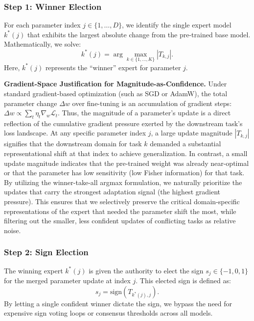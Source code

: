\subsubsection{Step 1: Winner Election}
For each parameter index $j \in \{1, \ldots, D\}$, we identify the single expert model $k^*(j)$ that exhibits the largest absolute change from the pre-trained base model.
Mathematically, we solve:
\begin{equation}
    k^*(j) = \arg\max_{k \in \{1, \dots, K\}} \left| T_{k, j} \right|.
\end{equation}
Here, $k^*(j)$ represents the ``winner'' expert for parameter $j$.

\textbf{Gradient-Space Justification for Magnitude-as-Confidence.}
Under standard gradient-based optimization (such as SGD or AdamW), the total parameter change $\Delta w$ over fine-tuning is an accumulation of gradient steps: $\Delta w \propto \sum_t \eta_t \nabla_{w} \mathcal{L}_t$.
Thus, the magnitude of a parameter's update is a direct reflection of the cumulative gradient pressure exerted by the downstream task's loss landscape.
At any specific parameter index $j$, a large update magnitude $|T_{k, j}|$ signifies that the downstream domain for task $k$ demanded a substantial representational shift at that index to achieve generalization.
In contrast, a small update magnitude indicates that the pre-trained weight was already near-optimal or that the parameter has low sensitivity (low Fisher information) for that task.
By utilizing the winner-take-all argmax formulation, we naturally prioritize the updates that carry the strongest adaptation signal (the highest gradient pressure).
This ensures that we selectively preserve the critical domain-specific representations of the expert that needed the parameter shift the most, while filtering out the smaller, less confident updates of conflicting tasks as relative noise.

\subsubsection{Step 2: Sign Election}
The winning expert $k^*(j)$ is given the authority to elect the sign $s_j \in \{-1, 0, 1\}$ for the merged parameter update at index $j$.
This elected sign is defined as:
\begin{equation}
    s_j = \text{sign}\left( T_{k^*(j), j} \right).
\end{equation}
By letting a single confident winner dictate the sign, we bypass the need for expensive sign voting loops or consensus thresholds across all models.

